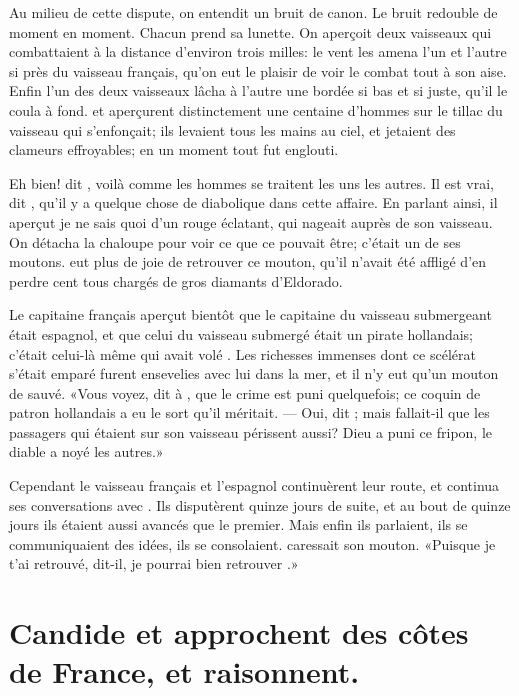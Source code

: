 Au milieu de cette dispute, on entendit un bruit de canon. Le bruit
redouble de moment en moment. Chacun prend sa lunette. On aperçoit deux
vaisseaux qui combattaient à la distance d’environ trois milles: le
vent les amena l’un et l’autre si près du vaisseau français, qu’on eut
le plaisir de voir le combat tout à son aise. Enfin l’un des deux
vaisseaux lâcha à l’autre une bordée si bas et si juste, qu’il le coula
à fond.  et  aperçurent distinctement une centaine
d’hommes sur le tillac du vaisseau qui s’enfonçait; ils levaient tous
les mains au ciel, et jetaient des clameurs effroyables; en un moment
tout fut englouti.

Eh bien! dit , voilà comme les hommes se traitent les uns les
autres. Il est vrai, dit , qu’il y a quelque chose de diabolique
dans cette affaire. En parlant ainsi, il aperçut je ne sais quoi d’un
rouge éclatant, qui nageait auprès de son vaisseau. On détacha la
chaloupe pour voir ce que ce pouvait être; c’était un de ses moutons.
 eut plus de joie de retrouver ce mouton, qu’il n’avait été
affligé d’en perdre cent tous chargés de gros diamants d’Eldorado.

Le capitaine français aperçut bientôt que le capitaine du vaisseau
submergeant était espagnol, et que celui du vaisseau submergé était un
pirate hollandais; c’était celui-là même qui avait volé . Les
richesses immenses dont ce scélérat s’était emparé furent ensevelies
avec lui dans la mer, et il n’y eut qu’un mouton de sauvé. «Vous voyez,
dit  à , que le crime est puni quelquefois; ce coquin de
patron hollandais a eu le sort qu’il méritait. — Oui, dit ; mais
fallait-il que les passagers qui étaient sur son vaisseau périssent
aussi? Dieu a puni ce fripon, le diable a noyé \linebreak les autres.»

Cependant le vaisseau français et l’espagnol continuèrent leur route,
et  continua ses conversations avec . Ils disputèrent
quinze jours de suite, et au bout de quinze jours ils étaient aussi
avancés que le premier. Mais enfin ils parlaient, ils se communiquaient
des idées, ils se consolaient.  caressait son mouton. «Puisque je
t’ai retrouvé, dit-il, je pourrai bien retrouver .»



\chapter[Candide et \bname{Martin} approchent des côtes…]{Candide et  approchent des côtes\\ de France, et raisonnent.}


